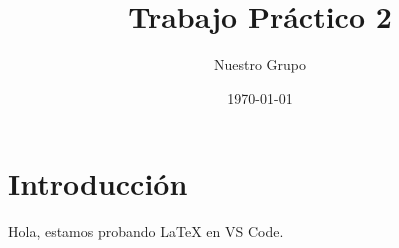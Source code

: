 \documentclass{article}
\title{Trabajo Práctico 2}
\author{Nuestro Grupo}
\date{\today}
\begin{document}
\maketitle

\section{Introducción}
Hola, estamos probando LaTeX en VS Code.
\end{document}
